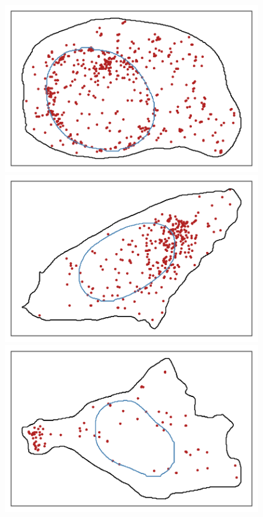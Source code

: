 \begin{figure}[]
	\endminipage\hfill
		\includegraphics[trim={0.5cm 0.5cm 0.5cm 0.5cm},clip,width=\linewidth]{figures/chapter5/plot_nuclear}
	\endminipage\hfill
		\includegraphics[trim={0.5cm 0.5cm 0.5cm 0.5cm},clip,width=\linewidth]{figures/chapter5/plot_perinuclear}
	\endminipage\hfill
		\includegraphics[trim={0.5cm 0.5cm 0.5cm 0.5cm},clip,width=\linewidth]{figures/chapter5/plot_protrusion}

\end{figure}

